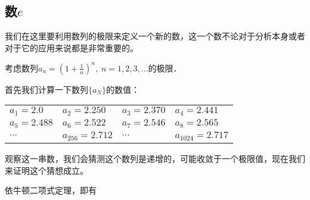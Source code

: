 \subsection{数$e$}
我们在这里要利用数列的极限来定义一个新的数，这一个数不论对于分析本身或者对于它的应用来说都是非常重要的。

考虑数列$a_n=\left(1+\frac{1}{n}\right)^n,\; n=1, 2, 3,\ldots$的极限．

首先我们计算一下数列$\{a_N\}$的数值：
\begin{center}
\begin{tabular}{llll}
   $a_1=2.0$ & $a_2=2.250$ & $a_3=2.370$& $a_4=2.441$\\
$a_5=2.488$ &$a_6=2.522$& $a_7=2.546$& $a_8=2.565$\\
$\cdots$ &$a_{256}=2.712$&$\cdots$&$a_{1024}=2.717$\\ 
\end{tabular}
\end{center}

观察这一串数，我们会猜测这个数列是递增的，可能收敛于一个极限值，现在我们来证明这个猜想成立。

依牛顿二项式定理，即有















\begin{example}
    
\end{example}


\begin{solution}
    
\end{solution}


\begin{example}
    
\end{example}

\begin{solution}
    
\end{solution}

\begin{example}
    
\end{example}

\begin{solution}
    
\end{solution}

